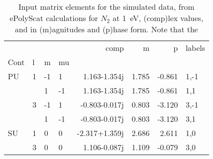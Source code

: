 \begin{table}

\begin{tabular}{llllrrrl}
\toprule
   &   &    &    &          comp &     m &      p & labels \\
Cont & l & m & mu &               &       &        &        \\
\midrule
PU & 1 & -1 &  1 &  1.163-1.354j & 1.785 & -0.861 &   1,-1 \\
   &   &  1 & -1 &  1.163-1.354j & 1.785 & -0.861 &    1,1 \\
   & 3 & -1 &  1 & -0.803-0.017j & 0.803 & -3.120 &   3,-1 \\
   &   &  1 & -1 & -0.803-0.017j & 0.803 & -3.120 &    3,1 \\
SU & 1 &  0 &  0 & -2.317+1.359j & 2.686 &  2.611 &    1,0 \\
   & 3 &  0 &  0 &  1.106-0.087j & 1.109 & -0.079 &    3,0 \\
\bottomrule
\end{tabular}

\caption{\label{tab:matE}Input matrix elements for the simulated data, from ePolyScat calculations for $N_2$ at 1~eV, (comp)lex values, and in (m)agnitudes and (p)hase form. Note that the }
\end{table}